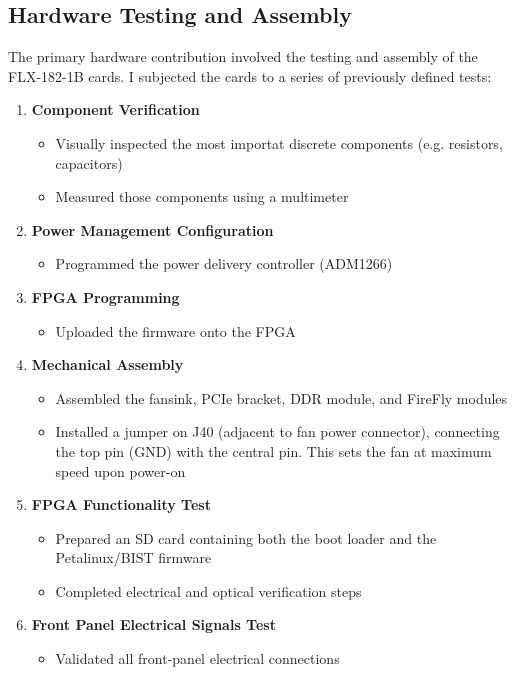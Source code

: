 \subsection{Hardware Testing and Assembly}
The primary hardware contribution involved the testing and assembly of the FLX-182-1B cards. I subjected the cards to a series of previously defined tests:

\begin{enumerate}
    \item \textbf{Component Verification}
    \begin{itemize}
        \item Visually inspected the most importat discrete components (e.g. resistors, capacitors)
        \item Measured those components using a multimeter
    \end{itemize}

    \item \textbf{Power Management Configuration}
    \begin{itemize}
        \item Programmed the power delivery controller (ADM1266)
    \end{itemize}

    \item \textbf{FPGA Programming}
    \begin{itemize}
        \item Uploaded the firmware onto the FPGA
    \end{itemize}

    \item \textbf{Mechanical Assembly}
    \begin{itemize}
        \item Assembled the fansink, PCIe bracket, DDR module, and FireFly modules
        \item Installed a jumper on J40 (adjacent to fan power connector), connecting the top pin (GND) with the central pin. This sets the fan at maximum speed upon power-on
    \end{itemize}

    \item \textbf{FPGA Functionality Test}
    \begin{itemize}
        \item Prepared an SD card containing both the boot loader and the Petalinux/BIST firmware
        \item Completed electrical and optical verification steps
    \end{itemize}

    \item \textbf{Front Panel Electrical Signals Test}
    \begin{itemize}
        \item Validated all front-panel electrical connections
    \end{itemize}
\end{enumerate}

